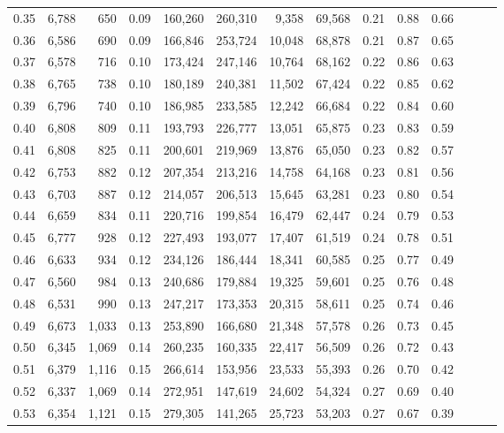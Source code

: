 \begin{tabular}{rrrrrrrrrrrrrr}
0.35 &  6,788 &    650 &  0.09 &  160,260 &  260,310 &   9,358 &  69,568 &  0.21 &  0.88 &      0.66 \\
0.36 &  6,586 &    690 &  0.09 &  166,846 &  253,724 &  10,048 &  68,878 &  0.21 &  0.87 &      0.65 \\
0.37 &  6,578 &    716 &  0.10 &  173,424 &  247,146 &  10,764 &  68,162 &  0.22 &  0.86 &      0.63 \\
0.38 &  6,765 &    738 &  0.10 &  180,189 &  240,381 &  11,502 &  67,424 &  0.22 &  0.85 &      0.62 \\
0.39 &  6,796 &    740 &  0.10 &  186,985 &  233,585 &  12,242 &  66,684 &  0.22 &  0.84 &      0.60 \\
0.40 &  6,808 &    809 &  0.11 &  193,793 &  226,777 &  13,051 &  65,875 &  0.23 &  0.83 &      0.59 \\
0.41 &  6,808 &    825 &  0.11 &  200,601 &  219,969 &  13,876 &  65,050 &  0.23 &  0.82 &      0.57 \\
0.42 &  6,753 &    882 &  0.12 &  207,354 &  213,216 &  14,758 &  64,168 &  0.23 &  0.81 &      0.56 \\
0.43 &  6,703 &    887 &  0.12 &  214,057 &  206,513 &  15,645 &  63,281 &  0.23 &  0.80 &      0.54 \\
0.44 &  6,659 &    834 &  0.11 &  220,716 &  199,854 &  16,479 &  62,447 &  0.24 &  0.79 &      0.53 \\
0.45 &  6,777 &    928 &  0.12 &  227,493 &  193,077 &  17,407 &  61,519 &  0.24 &  0.78 &      0.51 \\
0.46 &  6,633 &    934 &  0.12 &  234,126 &  186,444 &  18,341 &  60,585 &  0.25 &  0.77 &      0.49 \\
0.47 &  6,560 &    984 &  0.13 &  240,686 &  179,884 &  19,325 &  59,601 &  0.25 &  0.76 &      0.48 \\
0.48 &  6,531 &    990 &  0.13 &  247,217 &  173,353 &  20,315 &  58,611 &  0.25 &  0.74 &      0.46 \\
0.49 &  6,673 &  1,033 &  0.13 &  253,890 &  166,680 &  21,348 &  57,578 &  0.26 &  0.73 &      0.45 \\
0.50 &  6,345 &  1,069 &  0.14 &  260,235 &  160,335 &  22,417 &  56,509 &  0.26 &  0.72 &      0.43 \\
0.51 &  6,379 &  1,116 &  0.15 &  266,614 &  153,956 &  23,533 &  55,393 &  0.26 &  0.70 &      0.42 \\
0.52 &  6,337 &  1,069 &  0.14 &  272,951 &  147,619 &  24,602 &  54,324 &  0.27 &  0.69 &      0.40 \\
0.53 &  6,354 &  1,121 &  0.15 &  279,305 &  141,265 &  25,723 &  53,203 &  0.27 &  0.67 &      0.39 \\

\end{tabular}
